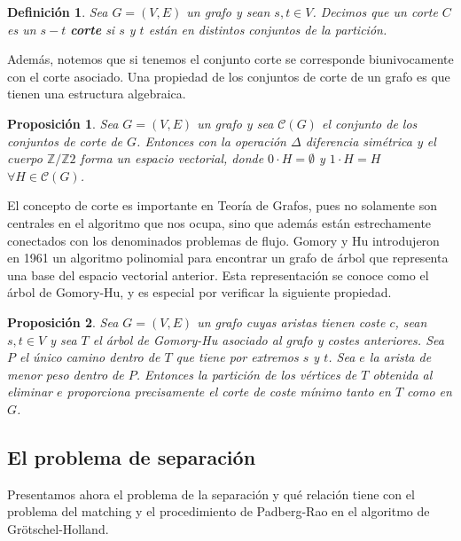\documentclass[twoside,a4paper,openright,12pt,tikz]{book}
\newtheorem{defi}{Definici\'on}[section]
\newtheorem{prop}{Proposici\'on}[section]
\newcommand{\Z}{\mathbb{Z}}
\begin{document}
\begin{defi}
Sea $G=(V,E)$ un grafo y sean $s,t\in V$. Decimos que un corte $C$ es un $s-t$ \textbf{corte} si $s$ y $t$ están en distintos conjuntos de la partición. 
\end{defi}

Además, notemos que si tenemos el conjunto corte se corresponde biunivocamente con el corte asociado. Una propiedad de los conjuntos de corte de un grafo es que tienen una estructura algebraica.



\begin{prop}
Sea $G=(V,E)$ un grafo y sea $\mathcal{C}(G)$ el conjunto de los conjuntos de corte de $G$. Entonces con la operación $\Delta$ diferencia simétrica y el cuerpo $\Z/\Z2$ forma un espacio vectorial, donde $0\cdot H = \emptyset$ y $1\cdot H = H$ $\forall H \in \mathcal{C}(G)$.
\end{prop}

El concepto de corte es importante en Teoría de Grafos, pues no solamente son centrales en el algoritmo que nos ocupa, sino que además están estrechamente conectados con los denominados problemas de flujo.  Gomory y Hu introdujeron en 1961 un algoritmo polinomial para encontrar un grafo de árbol que representa una base del espacio vectorial anterior. Esta representación se conoce como el árbol de Gomory-Hu, y es especial por verificar la siguiente propiedad.

\begin{prop}
Sea $G=(V,E)$ un grafo cuyas aristas tienen coste $c$, sean $s,t\in V$ y sea $T$ el árbol de Gomory-Hu asociado al grafo y costes anteriores. Sea $P$ el único camino dentro de $T$ que tiene por extremos $s$ y $t$. Sea $e$ la arista de menor peso dentro de $P$. Entonces la partición de los vértices de $T$ obtenida al eliminar $e$ proporciona precisamente el corte de coste mínimo tanto en $T$ como en $G$.
\end{prop}
\subsection{El problema de separación}

Presentamos ahora el problema de la separación y qué relación tiene con el problema del matching y el procedimiento de Padberg-Rao en el algoritmo de Grötschel-Holland. 
\end{document}
